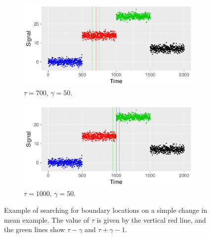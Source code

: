 \begin{figure}[H]
  \centering
  \begin{subfigure}{0.48\textwidth}
    \centering
    \includegraphics[width = \textwidth]{cim_6_new}
    \caption{$\tau = 700 $, $\gamma = 50.$}
  \label{fig:cim_6}
  \end{subfigure}
  \begin{subfigure}{0.48\textwidth}
    \centering
    \includegraphics[width = \textwidth]{cim_7_new}
  \caption{$\tau = 1000 $, $\gamma = 50.$}
  \label{fig:cim_7}
  \end{subfigure}
  \caption{Example of searching for boundary locations on a simple change in mean example. The value of $\tau$ is given by the vertical red line, and the green lines show $\tau  - \gamma$ and $\tau + \gamma - 1$.}
  \label{fig:change_in_mean}
\end{figure}

